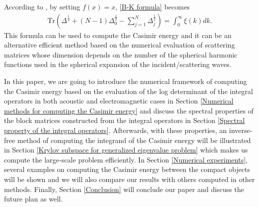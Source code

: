According to \cite{hanisch2020relative}, by setting $f(x) = x$, \eqref{B-K formula} becomes 
\begin{align*}
    \text{Tr}\left(\Delta^{\frac{1}{2}} + (N - 1)\Delta_{0}^{\frac{1}{2}} - \sum_{j = 1}^{N}\Delta_{j}^{\frac{1}{2}}\right)  = \int_{0}^{\infty}\xi(k)dk.
\end{align*}
This formula can be used to compute the Casimir energy and it can be an alternative efficient method based on the numerical evaluation of scattering matrices
whose dimension depends on the number of the spherical harmonic functions used in the spherical expansion of the incident/scattering waves.

In this paper, we are going to introduce the numerical framework of computing the Casimir energy based on the evaluation of the log determinant of the integral 
operators in both acoustic and electromagnetic cases in Section \ref{Numerical methods for computing the Casimir energy} and discuss the spectral properties 
of the block matrices constructed from the integral operators in Section \ref{Spectral property of the integral operators}. Afterwards, with these properties, 
an inverse-free method of computing the integrand of the Casimir energy will be illustrated in Section \ref{Krylov subspace for generalized eigenvalue problem}
which makes us compute the large-scale problem efficiently. In Section \ref{Numerical experiments}, several examples on computing the Casimir energy between 
the compact objects will be shown and we will also compare our results with others computed in other methods. Finally, Section \ref{Conclusion} will conclude 
our paper and discuss the future plan as well.